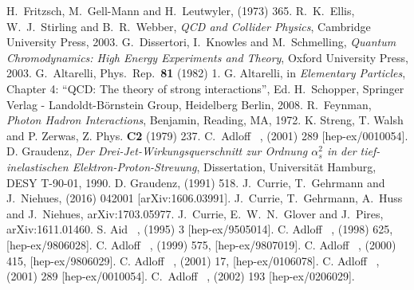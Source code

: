 \documentclass[12pt]{article}
\begin{document}
\begin{flushleft}
\begin{thebibliography}{99}
 H.~Fritzsch, M.~Gell-Mann and H.~Leutwyler,  (1973) 365.
 R.~K.~Ellis, W.~J.~Stirling and B.~R.~Webber, \emph{QCD and Collider Physics}, Cambridge University Press, 2003.
 G.~Dissertori, I.~Knowles and M.~Schmelling, \emph{Quantum Chromodynamics: High Energy Experiments and Theory}, Oxford University Press, 2003.
 G.~Altarelli, Phys.~Rep.~{\bf 81} (1982) 1.
 G. Altarelli, in \emph{Elementary Particles}, Chapter 4: ``QCD: The theory of strong interactions'', Ed. H.~Schopper, Springer Verlag - Landoldt-B\"ornstein Group, Heidelberg Berlin, 2008.
 R.~Feynman, \emph{Photon Hadron Interactions}, Benjamin, Reading, MA, 1972.
 K. Streng, T. Walsh and P. Zerwas,  Z. Phys. {\bf C2} (1979) 237.
%
 C.~Adloff \etal\ \Hone,  (2001) 289 [hep-ex/0010054].
%
 D. Graudenz, \emph{Der Drei-Jet-Wirkungsquerschnitt zur Ordnung $\alpha_s^2$ in der tief-inelastischen Elektron-Proton-Streuung}, Dissertation, Universit\"at Hamburg, DESY T-90-01, 1990.
 D. Graudenz,  (1991) 518.
%
  J.~Currie, T.~Gehrmann and J.~Niehues,  (2016) 042001 [arXiv:1606.03991].
%
  J.~Currie, T.~Gehrmann, A.~Huss and J.~Niehues, arXiv:1703.05977.
%
  J.~Currie, E.~W.~N.~Glover and J.~Pires,
  arXiv:1611.01460.
%
 S. Aid \etal\ \Hone,  (1995) 3 [hep-ex/9505014].
 C. Adloff \etal\ \Hone,  (1998) 625, [hep-ex/9806028].
 C. Adloff \etal\ \Hone,  (1999) 575, [hep-ex/9807019].
 C. Adloff \etal\ \Hone,  (2000) 415, [hep-ex/9806029].
 C. Adloff \etal\ \Hone,  (2001) 17, [hep-ex/0106078].
 C. Adloff  \etal\ \Hone,  (2001) 289 [hep-ex/0010054].
  C.~Adloff  \etal\ \Hone,
   (2002) 193
  [hep-ex/0206029].

\end{thebibliography}
\end{flushleft}
\end{document}
